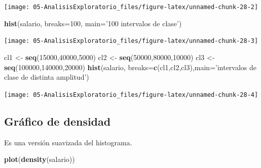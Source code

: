 \documentclass[]{book}
\newenvironment{Shaded}{\begin{snugshade}}{\end{snugshade}}
\newcommand{\DataTypeTok}[1]{\textcolor[rgb]{0.13,0.29,0.53}{#1}}
\newcommand{\DecValTok}[1]{\textcolor[rgb]{0.00,0.00,0.81}{#1}}
\newcommand{\KeywordTok}[1]{\textcolor[rgb]{0.13,0.29,0.53}{\textbf{#1}}}
\newcommand{\NormalTok}[1]{#1}
\newcommand{\StringTok}[1]{\textcolor[rgb]{0.31,0.60,0.02}{#1}}
\begin{document}
\begin{center}\texttt{[image: 05-AnalisisExploratorio\_files/figure-latex/unnamed-chunk-28-2]} \end{center}

\begin{Shaded}
\begin{Highlighting}[]
\KeywordTok{hist}\NormalTok{(salario, }\DataTypeTok{breaks=}\DecValTok{100}\NormalTok{, }\DataTypeTok{main=}\StringTok{'100 intervalos de clase'}\NormalTok{)}
\end{Highlighting}
\end{Shaded}

\begin{center}\texttt{[image: 05-AnalisisExploratorio\_files/figure-latex/unnamed-chunk-28-3]} \end{center}

\begin{Shaded}
\begin{Highlighting}[]
\NormalTok{cl1 <-}\StringTok{ }\KeywordTok{seq}\NormalTok{(}\DecValTok{15000}\NormalTok{,}\DecValTok{40000}\NormalTok{,}\DecValTok{5000}\NormalTok{)}
\NormalTok{cl2 <-}\StringTok{ }\KeywordTok{seq}\NormalTok{(}\DecValTok{50000}\NormalTok{,}\DecValTok{80000}\NormalTok{,}\DecValTok{10000}\NormalTok{)}
\NormalTok{cl3 <-}\StringTok{ }\KeywordTok{seq}\NormalTok{(}\DecValTok{100000}\NormalTok{,}\DecValTok{140000}\NormalTok{,}\DecValTok{20000}\NormalTok{)}
\KeywordTok{hist}\NormalTok{(salario, }\DataTypeTok{breaks=}\KeywordTok{c}\NormalTok{(cl1,cl2,cl3),}\DataTypeTok{main=}\StringTok{'intervalos de clase de distinta amplitud'}\NormalTok{)}
\end{Highlighting}
\end{Shaded}

\begin{center}\texttt{[image: 05-AnalisisExploratorio\_files/figure-latex/unnamed-chunk-28-4]} \end{center}

\hypertarget{grafico-de-densidad}{%
\subsection{Gráfico de densidad}\label{grafico-de-densidad}}

Es una versión suavizada del histograma.

\begin{Shaded}
\begin{Highlighting}[]
\KeywordTok{plot}\NormalTok{(}\KeywordTok{density}\NormalTok{(salario))}
\end{Highlighting}
\end{Shaded}
\end{document}
